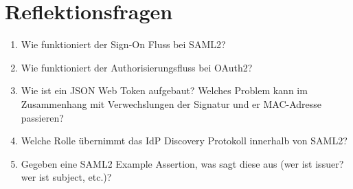 \section{Reflektionsfragen}

\begin{enumerate}
	\item Wie funktioniert der Sign-On Fluss bei SAML2?
	\item Wie funktioniert der Authorisierungsfluss bei OAuth2?
	\item Wie ist ein JSON Web Token aufgebaut? Welches Problem kann im Zusammenhang mit Verwechslungen der Signatur und er MAC-Adresse passieren?
	\item Welche Rolle übernimmt das IdP Discovery Protokoll innerhalb von SAML2?
	\item Gegeben eine SAML2 Example Assertion, was sagt diese aus (wer ist issuer? wer ist subject, etc.)?
\end{enumerate}
